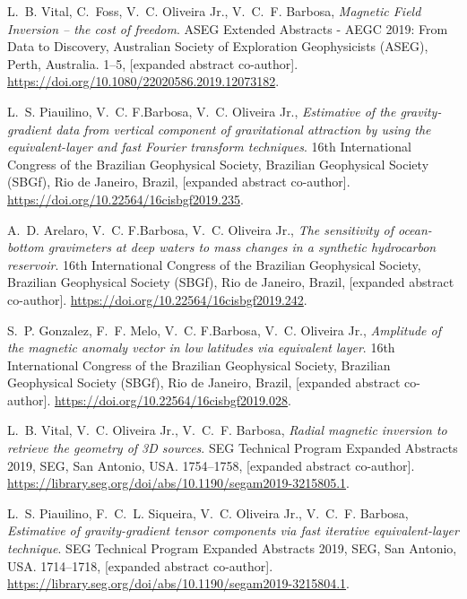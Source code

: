 
\nocite{*}

%
\begin{thebibliography}{10}

L.~B. Vital, C.~Foss, V.~C. Oliveira{ }Jr., V.~C.~F. Barbosa, \emph{Magnetic
  Field Inversion – the cost of freedom}. {ASEG Extended
  Abstracts - AEGC 2019: From Data to Discovery}, Australian Society of
  Exploration Geophysicists (ASEG), Perth, Australia. 1--5, [expanded
  abstract co-author].
  \url{https://doi.org/10.1080/22020586.2019.12073182}.

L.~S. Piauilino, V.~C. F.Barbosa, V.~C. Oliveira{ }Jr., \emph{Estimative of the
  gravity-gradient data from vertical component of gravitational attraction by
  using the equivalent-layer and fast Fourier transform techniques}. 
  {16th International Congress of the Brazilian Geophysical Society},
  Brazilian Geophysical Society (SBGf), Rio de Janeiro, Brazil, [expanded
  abstract co-author].
  \url{https://doi.org/10.22564/16cisbgf2019.235}.

A.~D. Arelaro, V.~C. F.Barbosa, V.~C. Oliveira{ }Jr., \emph{The sensitivity of
  ocean-bottom gravimeters at deep waters to mass changes in a synthetic
  hydrocarbon reservoir}. {16th International Congress of the
  Brazilian Geophysical Society}, Brazilian Geophysical Society (SBGf), Rio de
  Janeiro, Brazil, [expanded abstract co-author].
  \url{https://doi.org/10.22564/16cisbgf2019.242}.

S.~P. Gonzalez, F.~F. Melo, V.~C. F.Barbosa, V.~C. Oliveira{ }Jr.,
  \emph{Amplitude of the magnetic anomaly vector in low latitudes via
  equivalent layer}. {16th International Congress of the Brazilian
  Geophysical Society}, Brazilian Geophysical Society (SBGf), Rio de Janeiro,
  Brazil, [expanded abstract co-author].
  \url{https://doi.org/10.22564/16cisbgf2019.028}.

L.~B. Vital, V.~C. Oliveira{ }Jr., V.~C.~F. Barbosa, \emph{Radial magnetic
  inversion to retrieve the geometry of 3D sources}. {SEG
  Technical Program Expanded Abstracts 2019}, SEG, San Antonio, USA.
  1754--1758, [expanded abstract co-author].
  \url{https://library.seg.org/doi/abs/10.1190/segam2019-3215805.1}.

L.~S. Piauilino, F.~C.~L. Siqueira, V.~C. Oliveira{ }Jr., V.~C.~F. Barbosa,
  \emph{Estimative of gravity-gradient tensor components via fast iterative
  equivalent-layer technique}. {SEG Technical Program Expanded
  Abstracts 2019}, SEG, San Antonio, USA. 1714--1718, [expanded
  abstract co-author].
  \url{https://library.seg.org/doi/abs/10.1190/segam2019-3215804.1}.


\end{thebibliography}
